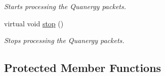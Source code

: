 \begin{DoxyCompactItemize}
\begin{DoxyCompactList}\small\item\em Starts processing the Quanergy packets. \end{DoxyCompactList}\item 
\hypertarget{classquanergy_1_1client_1_1TCPClient_a96bbbcb279b343854262f521ac55ec86}{virtual void \hyperlink{classquanergy_1_1client_1_1TCPClient_a96bbbcb279b343854262f521ac55ec86}{stop} ()}\label{classquanergy_1_1client_1_1TCPClient_a96bbbcb279b343854262f521ac55ec86}

\begin{DoxyCompactList}\small\item\em Stops processing the Quanergy packets. \end{DoxyCompactList}\end{DoxyCompactItemize}
\subsection*{Protected Member Functions}
